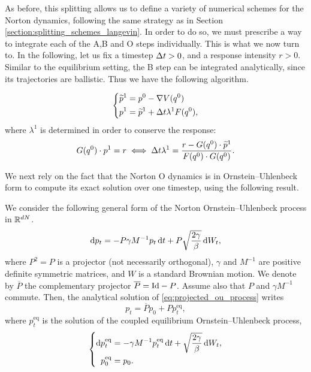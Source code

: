As before, this splitting allows us to define a variety of numerical schemes for the Norton dynamics, following the same strategy as in Section \ref{section:splitting_schemes_langevin}.
In order to do so, we must prescribe a way to integrate each of the A,B and O steps individually. This is what we now turn to.
In the following, let us fix a timestep ${\Delta t}>0$, and a response intensity $r>0$. Similar to the equilibrium setting, the B step can be integrated analytically, since its trajectories are ballistic.
Thus we have the following algorithm.
\begin{algorithm}
    \begin{equation}
        \label{eq:norton_B_step}
        \left\{\begin{aligned}
            \widetilde{p}^{1} &= p^0 - \nabla V(q^0)\\
            p^{1} &= \widetilde{p}^{1} +{\Delta t} \lambda^{1} F(q^0),
        \end{aligned}\right.
    \end{equation}
    where $\lambda^{1}$ is determined in order to conserve the response:
    \begin{equation}
        \label{eq:norton_B_step_lambda}
        G(q^0)\cdot p^{1} = r \iff {\Delta t}\lambda^{1} = \frac{r-G(q^0)\cdot \widetilde{p}^{1}}{F(q^0)\cdot G(q^0)}.
    \end{equation}
\end{algorithm}
We next rely on the fact that the Norton O dynamics is in Ornstein--Uhlenbeck form to compute its exact solution over one timestep, using the following result.
\begin{prop}
    \label{prop:projected_ou_process}
    We consider the following general form of the Norton Ornstein--Uhlenbeck process in $\mathbb{R}^{dN}$. 
    \begin{equation}
        \label{eq:projected_ou_process}
        \mathrm{d} p_t = - P \gamma M^{-1} p_t \,\mathrm{d} t + P\sqrt{\frac{2\gamma}\beta}\,\mathrm{d} W_t,
    \end{equation}  
    where $P^2=P$ is a projector (not necessarily orthogonal), $\gamma$ and $M^{-1}$ are positive definite symmetric matrices, and $W$ is a standard Brownian motion. We denote by $\overline P$ the complementary projector 
    $\overline P=\mathrm{Id} - P$. Assume also that $P$ and  $\gamma M^{-1}$ commute. Then, the analytical solution of \eqref{eq:projected_ou_process} writes
    \begin{equation}
        \label{eq:projected_ou_process_solved}
        p_t=\overline{P}p_0 + Pp_t^{\mathrm{eq}},
    \end{equation}
    where $p_t^{\mathrm{eq}}$ is the solution of the coupled equilibrium Ornstein--Uhlenbeck process,
    \begin{equation}
        \left\{\begin{aligned}
            \mathrm{d} p_t^{\mathrm{eq}} &= - \gamma M^{-1} p_t^{\mathrm{eq}} \,\mathrm{d} t + \sqrt{\frac{2\gamma}\beta}\,\mathrm{d} W_t,\\
            p_0^{\mathrm{eq}} &= p_0.   
        \end{aligned}\right.
    \end{equation}
\end{prop}
